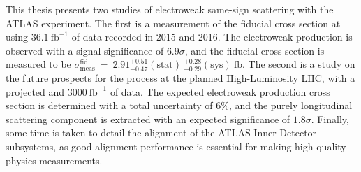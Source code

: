 This thesis presents two studies of electroweak same-sign \ssww scattering with the ATLAS experiment.
The first is a measurement of the fiducial cross section at  using $36.1~\mathrm{fb}^{-1}$ of data recorded in 2015 and 2016.
The electroweak production is observed with a signal significance of $6.9\sigma$, and the fiducial cross section is measured to be $\sigma_{\textrm{meas}}^{\textrm{fid}}~=~2.91^{+0.51}_{-0.47}(\textrm{stat})~^{+0.28}_{-0.29}(\textrm{sys})~\textrm{fb}$.
The second is a study on the future prospects for the \ssww process at the planned High-Luminosity LHC, with a projected  and $3000~\mathrm{fb}^{-1}$ of data.
The expected electroweak production cross section is determined with a total uncertainty  of $6\%$, and the purely longitudinal scattering component is extracted with an expected significance of $1.8\sigma$.
Finally, some time is taken to detail the alignment of the ATLAS Inner Detector subsystems, as good alignment performance is essential for making high-quality physics measurements.
